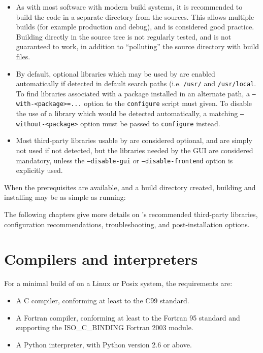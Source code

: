 \documentclass[a4paper,10pt,twoside]{csshortdoc}
\begin{document}
\begin{itemize}
\item As with most software with modern build systems, it is recommended
      to build the code in a separate directory from the sources. This
      allows multiple builds (for example production and debug), and is
      considered good practice. Building directly in the source tree is
      not regularly tested, and is not guaranteed to work, in addition
      to ``polluting'' the source directory with build files.
\item By default, optional libraries which may be used by \CS are
      enabled automatically if detected in default search paths
      (i.e. \texttt{/usr/} and \texttt{/usr/local}. To find libraries
      associated with a package installed in an alternate path,
      a \texttt{--with-<package>=...} option to the \texttt{configure} script
      must given. To disable the use of a library which would be
      detected automatically, a matching \texttt{--without-<package>} option
      must be passed to \texttt{configure} instead.
\item Most third-party libraries usable by \CS are considered optional,
      and are simply not used if not detected, but the libraries needed by
      the GUI are considered mandatory, unless the \texttt{--disable-gui}
      or \texttt{--disable-frontend} option is explicitly used.
\end{itemize}

When the prerequisites are available, and a build directory
created, building and installing \CS may be as simple as running:


The following chapters give more details on \CS's recommended
third-party libraries, configuration recommendations, troubleshooting,
and post-installation options.

\section{Compilers and interpreters\label{sec:compiler}}

For a minimal build of \CS on a Linux or Posix system, the requirements are:
\begin{itemize}
\item A C compiler, conforming at least to the C99 standard.
\item A Fortran compiler, conforming at least to the Fortran 95 standard
      and supporting the ISO\_C\_BINDING Fortran 2003 module.
\item A Python interpreter, with Python version 2.6 or above.
\end{itemize}
\end{document}
